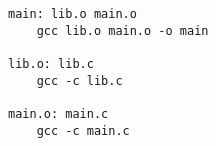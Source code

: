 \begin{lstlisting}
main: lib.o main.o
    gcc lib.o main.o -o main

lib.o: lib.c
    gcc -c lib.c

main.o: main.c 
    gcc -c main.c\end{lstlisting}
